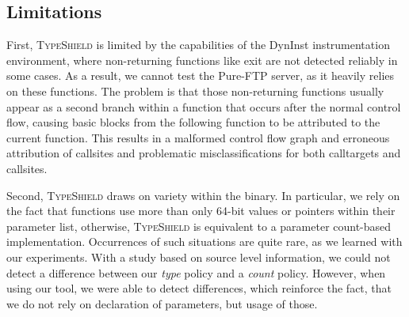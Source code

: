 % 
% 

\subsection{Limitations}
First, \textsc{TypeShield} is limited by the capabilities of the DynInst instrumentation environment, where non-returning functions like exit are 
not detected reliably in some cases. As a result, we cannot test the Pure-FTP server, as it heavily relies on these functions. 
The problem is that those non-returning functions usually appear as a second branch within a function that occurs after the normal 
control flow, causing basic blocks from the following function to be attributed to the current function. This results in a malformed 
control flow graph and erroneous attribution of callsites and problematic misclassifications for both calltargets and callsites.

Second, \textsc{TypeShield} draws on variety within the binary. In particular, we rely on the fact that functions use more than only 
64-bit values or pointers within their parameter list, otherwise, \textsc{TypeShield} is equivalent to a parameter count-based implementation. 
Occurrences of such situations are quite rare, as we learned with our experiments. With a study based on source level information, we could not 
detect a difference between our \textit{type} policy and a \textit{count} policy. However, when using our tool, we were able to detect differences,
which reinforce the fact, that we do not rely on declaration of parameters, but usage of those.


